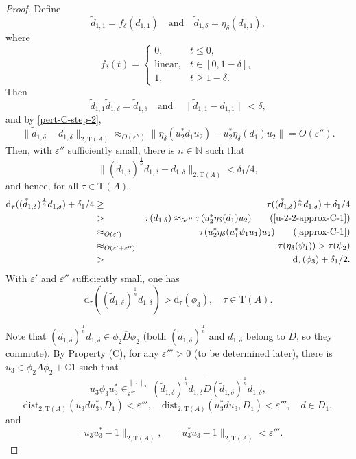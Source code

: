 \documentclass[10pt,a4paper]{amsart}
\newcommand{\Comp}{\mathbb C}
\newcommand{\eps}{\varepsilon}
\newcommand{\norm}[1]{\| #1\|}
\newcommand{\tr}{\mathrm{T}}
\begin{document}
\begin{proof}
Define
$$\tilde{d}_{1, 1} = f_{\delta}(d_{1, 1}) \quad \mathrm{and} \quad \tilde{d}_{1, \delta} = \eta_{\delta}(d_{1, 1}),$$
where
$$
f_{\delta}(t) = \left\{ 
\begin{array}{ll}
0, & t \leq 0, \\
\mathrm{linear}, & t\in [0, 1-\delta], \\
1, & t \geq 1-\delta.
\end{array}
\right.
$$ 
Then
\begin{equation}\label{pert-fur-hereditary}
 \tilde{d}_{1, 1} \tilde{d}_{1, \delta} = \tilde{d}_{1, \delta} \quad \mathrm{and} \quad \norm{\tilde{d}_{1, 1} - d_{1, 1}} < \delta,
 \end{equation}
and by \eqref{pert-C-step-2},
$$ \norm{\tilde{d}_{1, \delta} - d_{1, \delta}}_{2, \tr(A)} \approx_{O(\eps'')} \norm{\eta_\delta(u_2^* d_1 u_2) -  u^*_2\eta_\delta(d_1)u_2} = O(\eps'').$$
Then, with $\eps''$ sufficiently small, there is $n \in \mathbb N$ such that $$ \norm{(\tilde{d}_{1, \delta})^{\frac{1}{n}} d_{1, \delta} - d_{1, \delta}}_{2, \tr(A)} < \delta_1/4, $$
and hence, for all $\tau \in \tr(A)$,
\begin{eqnarray*}
\mathrm{d}_\tau((\tilde{d}_{1, \delta})^{\frac{1}{n}} d_{1, \delta}) + \delta_1/4 & \geq & \tau((\tilde{d}_{1, \delta})^{\frac{1}{n}} d_{1, \delta}) + \delta_1/4   \\
& > & \tau(d_{1, \delta}) \approx_{5\eps''} \tau(u_2^* \eta_{\delta}(d_1)u_2) \quad \quad (\eqref{u-2-2-approx-C-1}) \\
& \approx_{O(\eps')} &  \tau(u^*_2\eta_{\delta}(u_1^* \psi_1 u_1 )u_2) \quad\quad (\eqref{approx-C-1}) \\
& \approx_{O(\eps' + \eps'')} & \tau(\eta_{\delta}(\psi_1 ))  > \tau(\psi_2) \\ 
& > & \mathrm{d}_\tau(\phi_3) + \delta_1/2.
\end{eqnarray*}
With $\eps'$ and $\eps''$ sufficiently small, one has 
$$ \mathrm{d}_\tau((\tilde{d}_{1, \delta})^{\frac{1}{n}} d_{1, \delta}) > \mathrm{d}_\tau(\phi_3),\quad \tau \in \tr(A). $$
  

Note that $(\tilde{d}_{1, \delta})^{\frac{1}{n}} d_{1, \delta} \in \overline{\phi_2D\phi_2}$ (both $(\tilde{d}_{1, \delta})^{\frac{1}{n}}$ and  $d_{1, \delta}$ belong to $D$, so they commute). By Property (C), for any $\eps'''>0$ (to be determined later), there is $u_3 \in \overline{\phi_2 A \phi_2} + \Comp 1$ such that 
\begin{equation}\label{approx-C-3-h}
u_3\phi_3u_3^* \in _{\eps'''}^{\norm{\cdot}_2} \overline{(\tilde{d}_{1, \delta})^{\frac{1}{n}} d_{1, \delta} D (\tilde{d}_{1, \delta})^{\frac{1}{n}} d_{1, \delta}},
\end{equation}
$$\mathrm{dist}_{2, \tr(A)}(u_3 d u^*_3, D_1) < \eps''', \quad \mathrm{dist}_{2, \tr(A)}(u_3^*du_3, D_1) < \eps''',\quad d \in D_1, $$
and
\begin{equation}\label{approx-C-3-u}
\norm{u_3u_3^* - 1}_{2, \tr(A)},\quad  \norm{u_3^*u_3 - 1}_{2, \tr(A)} < \eps'''.
\end{equation}


\end{proof}
\end{document}
